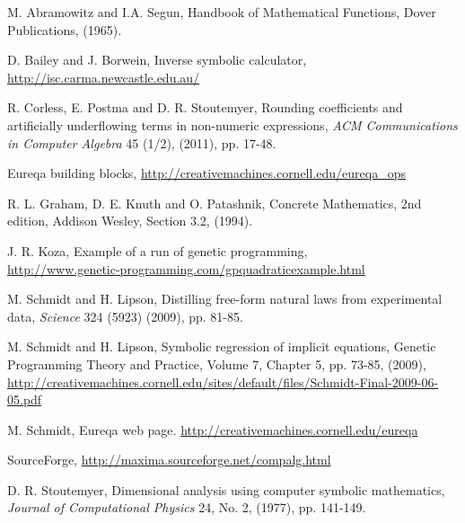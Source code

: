 \documentclass[12pt,english]{article}
\begin{document}
\begin{thebibliography}{14}
M. Abramowitz and I.A. Segun, Handbook
of Mathematical Functions, Dover Publications, (1965).\vspace{-5pt}


D. Bailey and J. Borwein, Inverse
symbolic calculator,\\
 \url{http://isc.carma.newcastle.edu.au/}\vspace{-5pt}


R. Corless, E. Postma and D. R. Stoutemyer,
Rounding coefficients and artificially underflowing terms in non-numeric
expressions, \textsl{ACM Communications in Computer Algebra} 45 (1/2),
(2011), pp. 17-48.\vspace{-5pt}


Eureqa building blocks, \url{http://creativemachines.cornell.edu/eureqa_ops}\vspace{-5pt}


R. L. Graham, D. E. Knuth and O. Patashnik,
Concrete Mathematics, 2nd edition, Addison Wesley, Section 3.2, (1994).\vspace{-5pt}


J. R. Koza, Example of a
run of genetic programming,\\
\url{http://www.genetic-programming.com/gpquadraticexample.html}

M. Schmidt and H. Lipson, Distilling free-form
natural laws from experimental data, \textsl{Science} 324 (5923) (2009),
pp. 81-85.\vspace{-5pt}


M. Schmidt and H. Lipson, Symbolic
regression of implicit equations, Genetic Programming Theory and Practice,
Volume 7, Chapter 5, pp. 73-85, (2009), \url{http://creativemachines.cornell.edu/sites/default/files/Schmidt-Final-2009-06-05.pdf}

M. Schmidt, Eureqa web page. \url{http://creativemachines.cornell.edu/eureqa}\vspace{-5pt}


SourceForge, \url{http://maxima.sourceforge.net/compalg.html}\vspace{-5pt}


D. R. Stoutemyer, Dimensional
analysis using computer symbolic mathematics,\textquotedbl{} \textsl{Journal
of Computational Physics} 24, No. 2, (1977), pp. 141-149.\vspace{-5pt}



\end{thebibliography}
\end{document}

